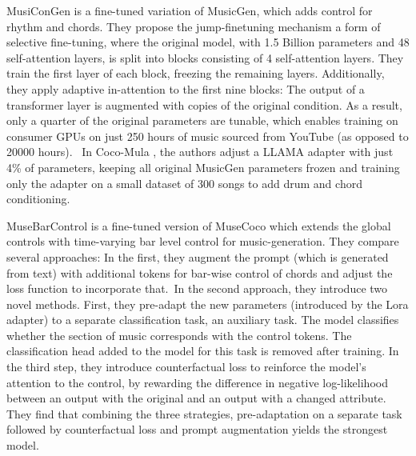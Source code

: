 MusiConGen \cite{Lan_Hsiao_Cheng_Yang_musicongen_2024} is a fine-tuned variation of MusicGen, which adds control for rhythm and chords. They propose the jump-finetuning mechanism a form of selective fine-tuning, where the original model, with 1.5 Billion parameters and 48 self-attention layers, is split into blocks consisting of 4 self-attention layers. They train the first layer of each block, freezing the remaining layers. Additionally, they apply adaptive in-attention to the first nine blocks: The output of a transformer layer is augmented with copies of the original condition. As a result, only a quarter of the original parameters are tunable, which enables training on consumer GPUs on just 250 hours of music sourced from YouTube (as opposed to 20000 hours).  In Coco-Mula \cite{Lin_cocomulla_2024}, the authors adjust a LLAMA adapter with just 4\% of parameters, keeping all original MusicGen parameters frozen and training only the adapter on a small dataset of 300 songs to add drum and chord conditioning. 

MuseBarControl \cite{Shu_Xu_Musebarcontrol_2024} is a fine-tuned version of MuseCoco \cite{Lu_Xu_Kang_Yu_Xing_Tan_Bian_MuseCoco_2023} which extends the global controls with time-varying bar level control for music-generation. They compare several approaches: In the first, they augment the prompt (which is generated from text) with additional tokens for bar-wise control of chords and adjust the loss function to incorporate that. In the second approach, they introduce two novel methods. First, they pre-adapt the new parameters (introduced by the Lora adapter) to a separate classification task, an auxiliary task. The model classifies whether the section of music corresponds with the control tokens. The classification head added to the model for this task is removed after training. In the third step, they introduce counterfactual loss to reinforce the model's attention to the control, by rewarding the difference in negative log-likelihood between an output with the original and an output with a changed attribute. They find that combining the three strategies, pre-adaptation on a separate task followed by counterfactual loss and prompt augmentation yields the strongest model. 

